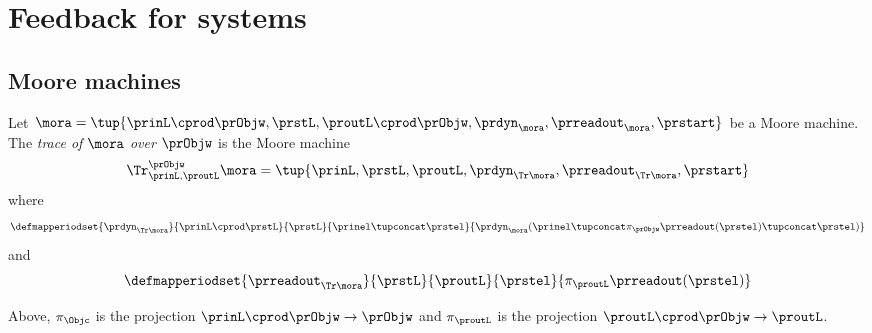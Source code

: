 
\section{Feedback for systems}
\label{sec:feedback-processes}



\subsection{Moore machines}



\begin{definition}
Let $\mora = \tup{\prinL \cprod \prObjw,\prstL,\proutL \cprod \prObjw, \prdyn_\mora,\prreadout_\mora,\prstart}$ be a Moore machine. The \emph{trace of} $\mora$ \emph{over} $\prObjw$ is the Moore machine 
\begin{equation}
\Tr_{\prinL,\proutL}^\prObjw \mora = \tup{\prinL,\prstL,\proutL, \prdyn_{\Tr \mora},  \prreadout_{\Tr \mora} ,\prstart}
\end{equation}
where 
\begin{equation}
  \defmapperiodset{
        \prdyn_{\Tr \mora}
    }{
        \prinL \cprod \prstL 
    }{
        \prstL 
    }{
        \prinel \tupconcat \prstel
    }{
        \prdyn_\mora(\prinel \tupconcat \pi_\prObjw  \prreadout (\prstel) \tupconcat \prstel)
    }
\end{equation}
and 
\begin{equation}
  \defmapperiodset{
        \prreadout_{\Tr \mora}
    }{
        \prstL 
    }{
        \proutL 
    }{
        \prstel
    }{
        \pi_\proutL \prreadout (\prstel)
    }
\end{equation}

Above, $\pi_\Objc$ is the projection $\prinL \cprod \prObjw \to \prObjw$ and $\pi_\proutL$ is the projection $\proutL \cprod \prObjw \to \proutL$.
\end{definition}


